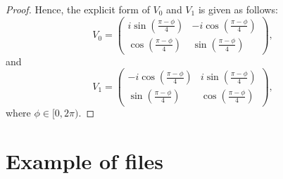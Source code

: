 \documentclass[preprint,12pt, a4paper, dvipsnames]{elsarticle}
\newcommand{\1}{{\rm 1\hspace{-0.9mm}l}}
\newcommand{\Id}{{\rm 1\hspace{-0.9mm}l}}
\newcommand{\PP}{\mathcal{P}}
\newcommand{\diag}{\mathrm{diag}}
\begin{document}
\begin{proof}
	Hence, the explicit form of $V_0$ and $V_1$ is given as
	follows: 
	\begin{equation}
	V_0 = \left(
	\begin{array}{cc}i \sin\left( \frac{\pi - \phi}{4} \right)&-i
	\cos\left( \frac{\pi - \phi}{4} \right)\\ \cos\left( \frac{\pi -
		\phi}{4}\right)& \sin\left( \frac{\pi - \phi}{4} \right)
	\end{array}
	\right),
	\end{equation}
and
	\begin{equation}
	V_1 = \left(\begin{array}{cc}-i \cos\left(\frac{\pi - \phi}{4}\right) &i
	\sin\left( \frac{\pi - \phi}{4}\right)\\\sin\left( \frac{\pi - \phi}{4}
	\right) &  \cos\left( \frac{\pi - \phi}{4} \right) \end{array}\right),
	\end{equation}
	where $\phi \in [0,2\pi)$.
\end{proof}


\section{Example of files} \label{app:example}
\end{document}
